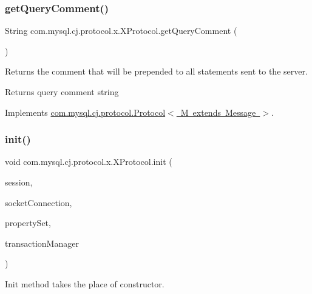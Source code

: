 \subsubsection{\texorpdfstring{get\+Query\+Comment()}{getQueryComment()}}
{\footnotesize\ttfamily String com.\+mysql.\+cj.\+protocol.\+x.\+X\+Protocol.\+get\+Query\+Comment (\begin{DoxyParamCaption}{ }\end{DoxyParamCaption})}

Returns the comment that will be prepended to all statements sent to the server.

\begin{DoxyReturn}{Returns}
query comment string 
\end{DoxyReturn}


Implements \mbox{\hyperlink{interfacecom_1_1mysql_1_1cj_1_1protocol_1_1_protocol_a8a25c27a012f47ca25de357e65829884}{com.\+mysql.\+cj.\+protocol.\+Protocol$<$ M extends Message $>$}}.

\mbox{\label{classcom_1_1mysql_1_1cj_1_1protocol_1_1x_1_1_x_protocol_a4007f4bf0c11af18162121e030183839}} 
\subsubsection{\texorpdfstring{init()}{init()}}
{\footnotesize\ttfamily void com.\+mysql.\+cj.\+protocol.\+x.\+X\+Protocol.\+init (\begin{DoxyParamCaption}\item[{\mbox{\hyperlink{interfacecom_1_1mysql_1_1cj_1_1_session}{Session}}}]{session,  }\item[{\mbox{\hyperlink{interfacecom_1_1mysql_1_1cj_1_1protocol_1_1_socket_connection}{Socket\+Connection}}}]{socket\+Connection,  }\item[{\mbox{\hyperlink{interfacecom_1_1mysql_1_1cj_1_1conf_1_1_property_set}{Property\+Set}}}]{property\+Set,  }\item[{\mbox{\hyperlink{interfacecom_1_1mysql_1_1cj_1_1_transaction_event_handler}{Transaction\+Event\+Handler}}}]{transaction\+Manager }\end{DoxyParamCaption})}

Init method takes the place of constructor.

